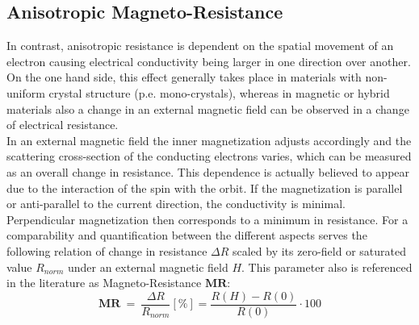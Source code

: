 \subsection{Anisotropic Magneto-Resistance}
In contrast, anisotropic resistance is dependent on the spatial movement of an electron causing electrical conductivity being larger in one direction over another. On the one hand side, this effect generally takes place in materials with non-uniform crystal structure (p.e. mono-crystals), whereas in magnetic or hybrid materials also a change in an external magnetic field can be observed in a change of electrical resistance.\\
In an external magnetic field the inner magnetization adjusts accordingly and the scattering cross-section of the conducting electrons varies, which can be measured as an overall change in resistance. This dependence is actually believed to appear due to the interaction of the spin with the orbit. If the magnetization is parallel or anti-parallel to the current direction, the conductivity is minimal. Perpendicular magnetization then corresponds to a minimum in resistance.\cite{lit:nano:physicsmagneticmaterials} \newpage
For a comparability and quantification between the different aspects serves the following relation of change in resistance $\Delta R$ scaled by its zero-field or saturated value $R_{norm}$ under an external magnetic field $H$. This parameter also is referenced in the literature as Magneto-Resistance $\mathbf{MR}$:
\begin{equation}
	\mathbf{MR}\ =\ \frac{\Delta R}{R_{norm}} [\%]= \frac{R(H) - R(0)}{R(0)} \cdot 100 
	\label{eq:nano:resistance_rel_change}
\end{equation}

